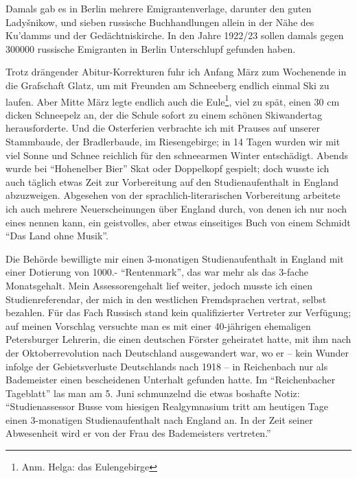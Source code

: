 Damals gab es in Berlin mehrere Emigrantenverlage, darunter den guten Ladyšnikow, und sieben russische Buchhandlungen allein in der Nähe des Ku'damms und der Gedächtniskirche. In den Jahre 1922/23 sollen damals gegen \num{300000} russische Emigranten in Berlin Unterschlupf gefunden haben.

Trotz drängender Abitur-Korrekturen fuhr ich Anfang März zum Wochenende in die Grafschaft Glatz, um mit Freunden am Schneeberg endlich einmal Ski zu laufen. Aber Mitte März legte endlich auch die Eule\footnote{Anm. Helga: das Eulengebirge}, viel zu spät, einen 30 cm dicken Schneepelz an, der die Schule sofort zu einem schönen Skiwandertag herausforderte. Und die Osterferien verbrachte ich mit Prauses auf unserer Stammbaude, der Bradlerbaude, im Riesengebirge; in 14 Tagen wurden wir mit viel Sonne und Schnee reichlich für den schneearmen Winter entschädigt. Abends wurde bei \enquote{Hohenelber Bier} Skat oder Doppelkopf gespielt; doch wusste ich auch täglich etwas Zeit zur Vorbereitung auf den Studienaufenthalt in England abzuzweigen. Abgesehen von der sprachlich-literarischen Vorbereitung arbeitete ich auch mehrere Neuerscheinungen über England durch, von denen ich nur noch eines nennen kann, ein geistvolles, aber etwas einseitiges Buch von einem Schmidt \enquote{Das Land ohne Musik}.

Die Behörde bewilligte mir einen 3-monatigen Studienaufenthalt in England mit einer Dotierung von \num{1000}.- \enquote{Rentenmark}, das war mehr als das 3-fache Monatsgehalt. Mein Assessorengehalt lief weiter, jedoch musste ich einen Studienreferendar, der mich in den westlichen Fremdsprachen vertrat, selbst bezahlen. Für das Fach Russisch stand kein qualifizierter Vertreter zur Verfügung; auf meinen Vorschlag versuchte man es mit einer 40-jährigen ehemaligen Petersburger Lehrerin, die einen deutschen Förster geheiratet hatte, mit ihm nach der Oktoberrevolution nach Deutschland ausgewandert war, wo er -- kein Wunder infolge der Gebietsverluste Deutschlands nach 1918 -- in Reichenbach nur als Bademeister einen bescheidenen Unterhalt gefunden hatte. Im \enquote{Reichenbacher Tageblatt} las man am 5. Juni schmunzelnd die etwas boshafte Notiz: \enquote{Studienassessor Busse vom hiesigen Realgymnasium tritt am heutigen Tage einen 3-monatigen Studienaufenthalt nach England an. In der Zeit seiner Abwesenheit wird er von der Frau des Bademeisters vertreten.}\\


